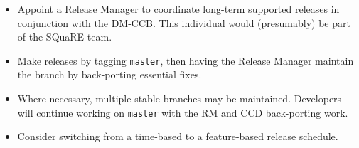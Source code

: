 \documentclass[letterpaper]{scrartcl}
\begin{document}
\begin{itemize}

  \item{Appoint a Release Manager to coordinate long-term supported releases
  in conjunction with the DM-CCB. This individual would (presumably) be part
  of the SQuaRE team.}

  \item{Make releases by tagging \texttt{master}, then having the Release
  Manager maintain the branch by back-porting essential fixes.}

  \item{Where necessary, multiple stable branches may be maintained.
  Developers will continue working on \texttt{master} with the RM and CCD
  back-porting work.}

  \item{Consider switching from a time-based to a feature-based release
  schedule.}

\end{itemize}
\end{document}
